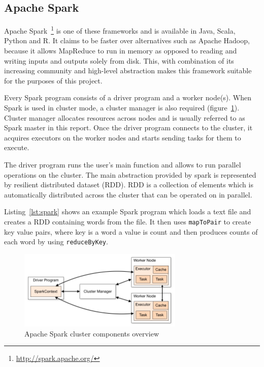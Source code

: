 \documentclass{l4proj}
\begin{document}
\subsection{Apache Spark}

Apache Spark~\footnote{\url{http://spark.apache.org/}} is one of these frameworks and is 
available in Java, Scala, Python and R. It claims to be faster over alternatives such as 
Apache Hadoop, because it allows MapReduce to run in memory as opposed to reading and 
writing inputs and outputs solely from disk. This, with combination of its increasing 
community and high-level abstraction makes this framework suitable for the purposes of this project.  

Every Spark program consists of a driver program and a worker node(s). When Spark is
used in cluster mode, a cluster manager is also required (figure~\ref{fig:spark}). Cluster manager allocates resources
across nodes and is usually referred to as Spark master in this report. Once the driver 
program connects to the cluster, it acquires executors on the worker nodes and
starts sending tasks for them to execute.

The driver program runs the user's main function and allows to run parallel operations on the cluster.
The main abstraction provided by spark is represented by resilient distributed dataset (RDD). RDD is
a collection of elements which is automatically distributed across the cluster that can be operated on
in parallel.

Listing~\ref{lst:spark} shows an example Spark program which loads a text file and creates a RDD
containing words from the file. It then uses \texttt{mapToPair} to create key value pairs, where 
key is a word a value is count and then produces counts of each word by using \texttt{reduceByKey}.

\begin{figure}
\centering
\includegraphics[width=0.7\textwidth]{images/spark.png}
\caption{Apache Spark cluster components overview ~\protect\footnotemark}
\label{fig:spark}
\end{figure}
\end{document}
